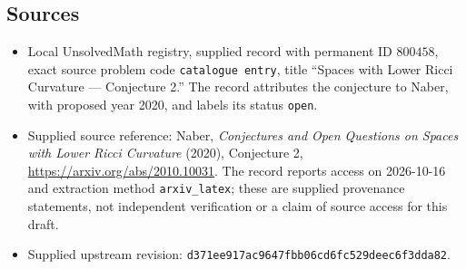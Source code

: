 \documentclass[11pt]{article}
\begin{document}
\subsection{Sources}
\begin{itemize}
\item Local UnsolvedMath registry, supplied record with permanent ID \(800458\), exact source problem code \texttt{catalogue entry}, title ``Spaces with Lower Ricci Curvature --- Conjecture 2.'' The record attributes the conjecture to Naber, with proposed year 2020, and labels its status \texttt{open}.
\item Supplied source reference: Naber, \emph{Conjectures and Open Questions on Spaces with Lower Ricci Curvature} (2020), Conjecture 2, \url{https://arxiv.org/abs/2010.10031}. The record reports access on 2026-10-16 and extraction method \texttt{arxiv\_latex}; these are supplied provenance statements, not independent verification or a claim of source access for this draft.
\item Supplied upstream revision: \texttt{d371ee917ac9647fbb06cd6fc529deec6f3dda82}.
\end{itemize}
\end{document}
